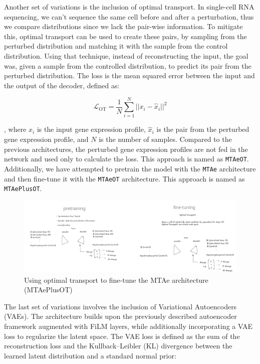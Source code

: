 \documentclass[12pt, a4paper]{article}
\begin{document}
Another set of variations is the inclusion of optimal transport. In single-cell RNA sequencing, we can't sequence the same cell before and after a perturbation, thus we compare distributions since we lack the pair-wise information. To mitigate this, optimal transport can be used to create these pairs, by sampling from the perturbed distribution and matching it with the sample from the control distribution. Using that technique, instead of reconstructing the input, the goal was, given a sample from the controlled distribution, to predict its pair from the perturbed distribution. The loss is the mean squared error between the input and the output of the decoder, defined as:

\[
\mathcal{L}_{\text{OT}} = \frac{1}{N} \sum_{i=1}^{N} ||x_i - \hat{x}_i||^2 
\]

, where $x_i$ is the input gene expression profile, $\hat{x}_i$ is the pair from the perturbed gene expression profile, and $N$ is the number of samples. Compared to the previous architectures, the perturbed gene expression profiles are not fed in the network and used only to calculate the loss. This approach is named as \verb|MTAeOT|. Additionally, we have attempted to pretrain the model with the \verb|MTAe| architecture and then fine-tune it with the \verb|MTAeOT| architecture. This approach is named as \verb|MTAePlusOT|.

\begin{figure}
    \centering
    \includegraphics[width=\textwidth]{ae_ot_sketch.png}
    \caption{Using optimal transport to fine-tune the MTAe architecture (MTAePlusOT)}
\end{figure}

The last set of variations involves the inclusion of Variational Autoencoders (VAEs). The architecture builds upon the previously described autoencoder framework augmented with FiLM layers, while additionally incorporating a VAE loss to regularize the latent space. The VAE loss is defined as the sum of the reconstruction loss and the Kullback--Leibler (KL) divergence between the learned latent distribution and a standard normal prior:
\end{document}
